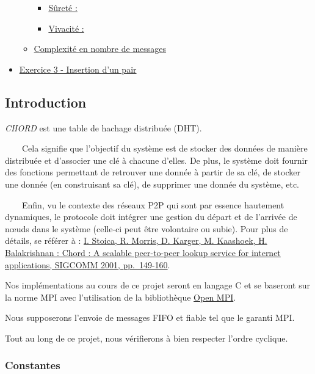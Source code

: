 \documentclass[
]{article}
\providecommand{\tightlist}{%
  \setlength{\itemsep}{0pt}\setlength{\parskip}{0pt}}
\begin{document}
\begin{itemize}
\begin{itemize}
    \begin{itemize}
    \tightlist
    \item
      \protect\hyperlink{suxfbretuxe9-}{Sûreté :}
    \item
      \protect\hyperlink{vivacituxe9-}{Vivacité :}
    \end{itemize}
  \item
    \protect\hyperlink{complexituxe9-en-nombre-de-messages}{Complexité
    en nombre de messages}
  \end{itemize}
\item
  \protect\hyperlink{exercice-3---insertion-dun-pair}{Exercice 3 -
  Insertion d'un pair}
\end{itemize}

\hypertarget{introduction}{%
\subsection{Introduction}\label{introduction}}

\emph{CHORD} est une table de hachage distribuée (DHT).

  Cela signifie que l'objectif du système est de stocker des données de
manière distribuée et d'associer une clé à chacune d'elles. De plus, le
système doit fournir des fonctions permettant de retrouver une donnée à
partir de sa clé, de stocker une donnée (en construisant sa clé), de
supprimer une donnée du système, etc.

  Enfin, vu le contexte des réseaux P2P qui sont par essence hautement
dynamiques, le protocole doit intégrer une gestion du départ et de
l'arrivée de nœuds dans le système (celle-ci peut être volontaire ou
subie). Pour plus de détails, se référer à :
\href{https://pdos.csail.mit.edu/papers/chord:sigcomm01/chord_sigcomm.pdf}{I.
Stoica, R. Morris, D. Karger, M. Kaashoek, H. Balakrishnan : Chord : A
scalable peer-to-peer lookup service for internet applications, SIGCOMM
2001, pp.~149-160}.

Nos implémentations au cours de ce projet seront en langage C et se
baseront sur la norme MPI avec l'utilisation de la bibliothèque
\href{https://www.open-mpi.org/}{Open MPI}.

Nous supposerons l'envoie de messages FIFO et fiable tel que le garanti
MPI.

Tout au long de ce projet, nous vérifierons à bien respecter l'ordre
cyclique.

\hypertarget{constantes}{%
\subsubsection{Constantes}\label{constantes}}
\end{document}
